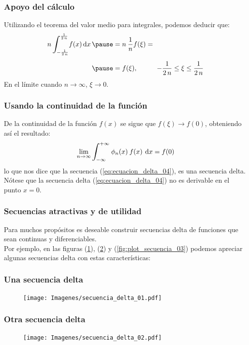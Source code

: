 \documentclass[12pt]{beamer}
\begin{document}
\begin{frame}
\frametitle{Apoyo del cálculo}
Utilizando el teorema del valor medio para integrales, podemos deducir que:
\pause
\begin{eqnarray*}
\begin{aligned}
n \, \scaleint{6ex}_{\bs -\frac{1}{2 \, n}}^{\frac{1}{2 \, n}} f (x) \dd{x} \pause &= n \: \dfrac{1}{n} f (\xi) = \\[0.5em] \pause
&= f (\xi), \hspace{1cm} - \dfrac{1}{2 \, n} \leq \xi \leq \dfrac{1}{2 \, n}
\end{aligned}
\end{eqnarray*}
En el límite cuando $n \to \infty$, $\xi \to 0$.
\end{frame}

\begin{frame}
\frametitle{Usando la continuidad de la función}
De la continuidad de la función $f (x)$ se sigue que $f (\xi) \to f (0)$, obteniendo así el resultado:
\pause
\begin{align*}
\lim_{n \to \infty} \scaleint{6ex}_{\bs -\infty}^{+ \infty} \: \phi_{n} (x) \: f (x) \: \dd{x} = f (0)
\end{align*}
lo que nos dice que la secuencia (\ref{eq:ecuacion_delta_04}), es una secuencia delta. \pause  Nótese que la secuencia delta (\ref{eq:ecuacion_delta_04}) no es derivable en el punto $x = 0$.
\end{frame}

\begin{frame}
\frametitle{Secuencias atractivas y de utilidad}
Para muchos propósitos es deseable construir secuencias delta de funciones que sean continuas y diferenciables.
\\
\bigskip
\pause 
Por ejemplo, en las figuras (\ref{fig:plot_secuencia_01}), (\ref{fig:plot_secuencia_02}) y (\ref{fig:plot_secuencia_03}) podemos apreciar algunas secuencias delta con estas características:
\end{frame}

\begin{frame}
\frametitle{Una secuencia delta}
\begin{figure}[H]
    \centering
    \texttt{[image: Imagenes/secuencia\_delta\_01.pdf]}
    \label{fig:plot_secuencia_01}
\end{figure}
\end{frame}

\begin{frame}
\frametitle{Otra secuencia delta}
\begin{figure}[H]
    \centering
    \texttt{[image: Imagenes/secuencia\_delta\_02.pdf]}
    \label{fig:plot_secuencia_02}
\end{figure}
\end{frame}
\end{document}
